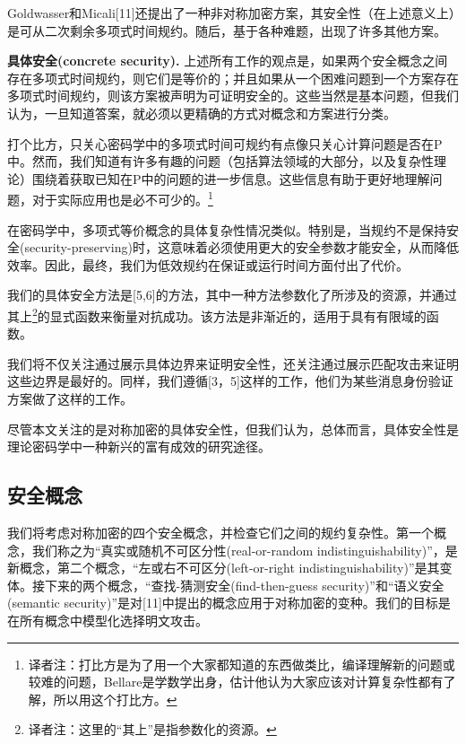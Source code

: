 \documentclass[]{article}
\begin{document}
Goldwasser和Micali[11]还提出了一种非对称加密方案，其安全性（在上述意义上）是可从二次剩余多项式时间规约。随后，基于各种难题，出现了许多其他方案。\par

\textbf{{\large 具体安全(concrete security).}}
上述所有工作的观点是，如果两个安全概念之间存在多项式时间规约，则它们是等价的；并且如果从一个困难问题到一个方案存在多项式时间规约，则该方案被声明为可证明安全的。这些当然是基本问题，但我们认为，一旦知道答案，就必须以更精确的方式对概念和方案进行分类。\par

打个比方，只关心密码学中的多项式时间可规约有点像只关心计算问题是否在P中。然而，我们知道有许多有趣的问题（包括算法领域的大部分，以及复杂性理论）围绕着获取已知在P中的问题的进一步信息。这些信息有助于更好地理解问题，对于实际应用也是必不可少的。\footnote{译者注：打比方是为了用一个大家都知道的东西做类比，编译理解新的问题或较难的问题，Bellare是学数学出身，估计他认为大家应该对计算复杂性都有了解，所以用这个打比方。}
\par

在密码学中，多项式等价概念的具体复杂性情况类似。特别是，当规约不是保持安全(security-preserving)时，这意味着必须使用更大的安全参数才能安全，从而降低效率。因此，最终，我们为低效规约在保证或运行时间方面付出了代价。\par

我们的具体安全方法是[5,6]的方法，其中一种方法参数化了所涉及的资源，并通过其上\footnote{译者注：这里的“其上”是指参数化的资源。}的显式函数来衡量对抗成功。该方法是非渐近的，适用于具有有限域的函数。\par

我们将不仅关注通过展示具体边界来证明安全性，还关注通过展示匹配攻击来证明这些边界是最好的。同样，我们遵循[3，5]这样的工作，他们为某些消息身份验证方案做了这样的工作。\par

尽管本文关注的是对称加密的具体安全性，但我们认为，总体而言，具体安全性是理论密码学中一种新兴的富有成效的研究途径。

\subsection{安全概念}
我们将考虑对称加密的四个安全概念，并检查它们之间的规约复杂性。第一个概念，我们称之为“真实或随机不可区分性(real-or-random indistinguishability)”，是新概念，第二个概念，“左或右不可区分(left-or-right indistinguishability)”是其变体。接下来的两个概念，“查找-猜测安全(find-then-guess security)”和“语义安全(semantic security)”是对[11]中提出的概念应用于对称加密的变种。我们的目标是在所有概念中模型化选择明文攻击。\par
\end{document}
